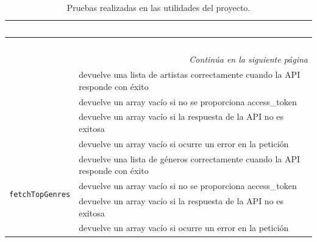 \begin{longtable}{|p{5cm}|p{9cm}|}
  \caption{Pruebas realizadas en las utilidades del proyecto.} \label{tab:pruebas_utilidades}                                \\

  \hline
  \rowcolor[HTML]{E6B8CE}
  \textbf{\textcolor{white}{Utilidad}}       & \textbf{\textcolor{white}{Test}}                                              \\ \hline
  \endfirsthead

  \hline
  \rowcolor[HTML]{E6B8CE}
  \textbf{\textcolor{white}{Utilidad}}       & \textbf{\textcolor{white}{Test}}                                              \\ \hline
  \endhead

  \hline \multicolumn{2}{|r|}{\textit{Continúa en la siguiente página}}                                                      \\ \hline
  \endfoot

  \hline
  \endlastfoot

  \multirow{4}{*}{\texttt{fetchTopArtists}}  & devuelve una lista de artistas correctamente cuando la API responde con éxito \\ \cline{2-2}
                                             & devuelve un array vacío si no se proporciona access\_token                    \\ \cline{2-2}
                                             & devuelve un array vacío si la respuesta de la API no es exitosa               \\ \cline{2-2}
                                             & devuelve un array vacío si ocurre un error en la petición                     \\ \hline

  \multirow{4}{*}{\texttt{fetchTopGenres}}   & devuelve una lista de géneros correctamente cuando la API responde con éxito  \\ \cline{2-2}
                                             & devuelve un array vacío si no se proporciona access\_token                    \\ \cline{2-2}
                                             & devuelve un array vacío si la respuesta de la API no es exitosa               \\ \cline{2-2}
                                             & devuelve un array vacío si ocurre un error en la petición                     \\ \hline


\end{longtable}
